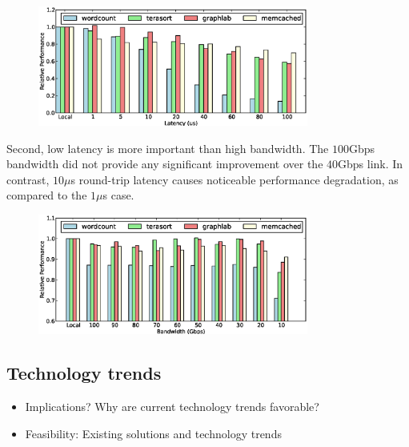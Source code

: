 %
\begin{figure}
  \centering
    \includegraphics[width = 3.5in]{img/fix_bw_vary_latency.eps} 
  \caption{\small{}}
  \label{fig:impl}
\end{figure}
%
Second, low latency is more important than high bandwidth. The $100$Gbps bandwidth did not provide any significant improvement over the $40$Gbps link. In contrast, $10\mu$s round-trip latency causes noticeable performance degradation, as compared to the $1\mu$s case.

%
\begin{figure}
  \centering
    \includegraphics[width = 3.5in]{img/fix_latency_vary_bw.eps} 
  \caption{\small{}}
  \label{fig:impb}
\end{figure}
%


\subsection{Technology trends}
\label{ssec:rtt}

\begin{itemize}
	\item Implications? Why are current technology trends favorable?
	\item Feasibility: Existing solutions and technology trends
\end{itemize}